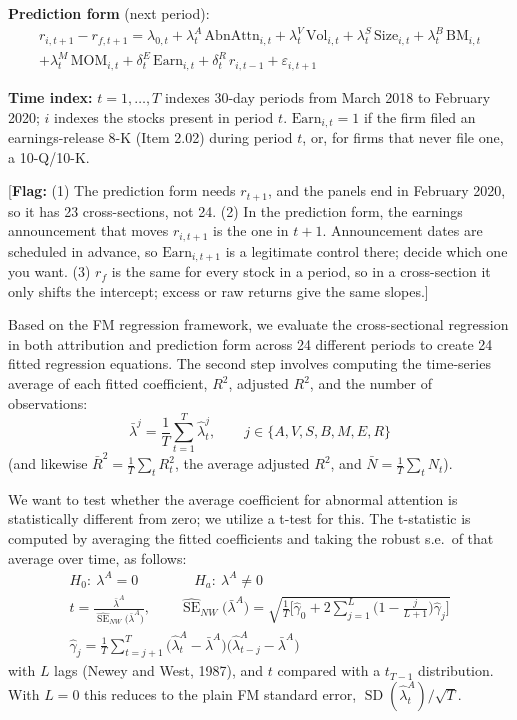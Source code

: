 \documentclass[11pt]{article}
\newcommand{\flag}[1]{{\color{red!75!black}\small [\textbf{Flag:} #1]}}
\begin{document}
\textbf{Prediction form} (next period):
\begin{multline}
r_{i,t+1} - r_{f,t+1} = \lambda_{0,t} + \lambda^{A}_{t}\,\text{AbnAttn}_{i,t} + \lambda^{V}_{t}\,\text{Vol}_{i,t} + \lambda^{S}_{t}\,\text{Size}_{i,t} + \lambda^{B}_{t}\,\text{BM}_{i,t} \\
 + \lambda^{M}_{t}\,\text{MOM}_{i,t} + \delta^{E}_{t}\,\text{Earn}_{i,t} + \delta^{R}_{t}\,r_{i,t-1} + \varepsilon_{i,t+1}
\end{multline}

\textbf{Time index:} $t = 1, \dots, T$ indexes 30-day periods from March 2018 to February 2020; $i$ indexes the stocks present in period $t$. $\text{Earn}_{i,t} = 1$ if the firm filed an earnings-release 8-K (Item 2.02) during period $t$, or, for firms that never file one, a 10-Q/10-K.

\flag{(1) The prediction form needs $r_{t+1}$, and the panels end in February 2020, so it has 23 cross-sections, not 24. (2) In the prediction form, the earnings announcement that moves $r_{i,t+1}$ is the one in $t+1$. Announcement dates are scheduled in advance, so $\text{Earn}_{i,t+1}$ is a legitimate control there; decide which one you want. (3) $r_f$ is the same for every stock in a period, so in a cross-section it only shifts the intercept; excess or raw returns give the same slopes.}

Based on the FM regression framework, we evaluate the cross-sectional regression in both attribution and prediction form across 24 different periods to create 24 fitted regression equations. The second step involves computing the time-series average of each fitted coefficient, $R^2$, adjusted $R^2$, and the number of observations:
\begin{equation}
\bar{\lambda}^{j} = \frac{1}{T}\sum_{t=1}^{T}\hat{\lambda}^{j}_{t}, \qquad j \in \{A, V, S, B, M, E, R\}
\end{equation}
(and likewise $\bar{R}^2 = \frac{1}{T}\sum_t R^2_t$, the average adjusted $R^2$, and $\bar{N} = \frac{1}{T}\sum_t N_t$).

We want to test whether the average coefficient for abnormal attention is statistically different from zero; we utilize a t-test for this. The t-statistic is computed by averaging the fitted coefficients and taking the robust s.e.\ of that average over time, as follows:
\begin{gather}
H_0:\ \lambda^{A} = 0 \qquad\qquad H_a:\ \lambda^{A} \neq 0 \\[4pt]
t = \frac{\bar{\lambda}^{A}}{\widehat{\operatorname{SE}}_{NW}\big(\bar{\lambda}^{A}\big)}, \qquad
\widehat{\operatorname{SE}}_{NW}\big(\bar{\lambda}^{A}\big) = \sqrt{\frac{1}{T}\Big[\hat{\gamma}_0 + 2\sum_{j=1}^{L}\Big(1 - \frac{j}{L+1}\Big)\hat{\gamma}_j\Big]} \\[4pt]
\hat{\gamma}_j = \frac{1}{T}\sum_{t=j+1}^{T}\big(\hat{\lambda}^{A}_{t} - \bar{\lambda}^{A}\big)\big(\hat{\lambda}^{A}_{t-j} - \bar{\lambda}^{A}\big)
\end{gather}
with $L$ lags (Newey and West, 1987), and $t$ compared with a $t_{T-1}$ distribution. With $L = 0$ this reduces to the plain FM standard error, $\operatorname{SD}(\hat{\lambda}^{A}_t)/\sqrt{T}$.
\end{document}
